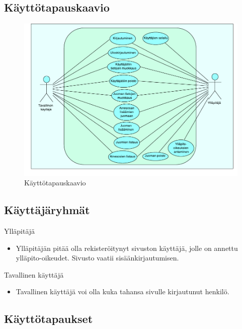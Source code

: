 \documentclass[a4paper]{article}
\begin{document}
\subsection{Käyttötapauskaavio}
\begin{figure}[h]
	
	\includegraphics[scale=0.9]{kayttotapaukset.pdf}
	\caption{Käyttötapauskaavio}
\end{figure}
	
\subsection{Käyttäjäryhmät}

\begin{flushleft}Ylläpitäjä\end{flushleft}
\begin{itemize}
\item Ylläpitäjän pitää olla rekisteröitynyt sivuston käyttäjä, jolle on annettu ylläpito-oikeudet. Sivusto vaatii sisäänkirjautumisen.
\end{itemize}
\begin{flushleft}Tavallinen käyttäjä\end{flushleft}
\begin{itemize}
\item Tavallinen käyttäjä voi olla kuka tahansa sivulle kirjautunut henkilö. 
\end{itemize}

\newpage
\subsection{Käyttötapaukset}
\end{document}
